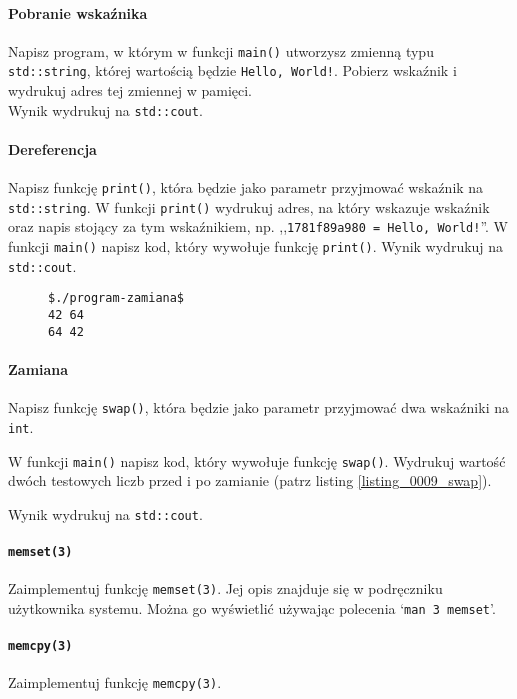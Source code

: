 \documentclass[11pt,a4paper,titlepage,onecolumn]{article}
\begin{document}
\paragraph{Pobranie wskaźnika} Napisz program, w którym w funkcji
\texttt{main()} utworzysz zmienną typu \texttt{std::string}, której wartością
będzie \texttt{Hello, World!}. Pobierz wskaźnik i wydrukuj adres tej zmiennej w
pamięci.\\
Wynik wydrukuj na \texttt{std::cout}.

\paragraph{Dereferencja}  Napisz funkcję \texttt{print()}, która będzie
jako parametr przyjmować wskaźnik na \texttt{std::string}. W funkcji
\texttt{print()} wydrukuj adres, na który wskazuje wskaźnik oraz napis stojący
za tym wskaźnikiem, np. ,,\texttt{1781f89a980 = Hello, World!}''. W funkcji
\texttt{main()} napisz kod, który wywołuje funkcję \texttt{print()}.
Wynik wydrukuj na \texttt{std::cout}.

\begin{figure}[!htp]
\begin{lstlisting}[caption={zamiana},
    captionpos=b,
    label=listing_0009_swap]
$./program-zamiana$
42 64
64 42
\end{lstlisting}
\end{figure}

\paragraph{Zamiana} Napisz funkcję \texttt{swap()}, która będzie
jako parametr przyjmować dwa wskaźniki na \texttt{int}.

W funkcji \texttt{main()} napisz kod, który wywołuje funkcję \texttt{swap()}.
Wydrukuj wartość dwóch testowych liczb przed i po zamianie (patrz listing
\ref{listing_0009_swap}).

Wynik wydrukuj na \texttt{std::cout}.

\paragraph{\texttt{memset(3)}} Zaimplementuj funkcję \texttt{memset(3)}. Jej
opis znajduje się w podręczniku użytkownika systemu. Można go wyświetlić
używając polecenia `\texttt{man 3 memset}'.

\paragraph{\texttt{memcpy(3)}} Zaimplementuj funkcję \texttt{memcpy(3)}.
\end{document}
